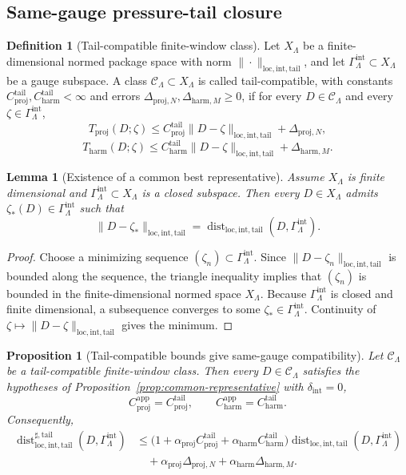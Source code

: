 \documentclass[11pt]{article}
\numberwithin{equation}{section}
\newtheorem{proposition}[proposition]{Proposition}
\newtheorem{lemma}[lemma]{Lemma}
\theoremstyle{definition}
\newtheorem{definition}[definition]{Definition}
\theoremstyle{remark}
\DeclareMathOperator{\dist}{dist}
\newcommand{\loc}{\mathrm{loc}}
\newcommand{\intg}{\mathrm{int}}
\newcommand{\tail}{\mathrm{tail}}
\newcommand{\proj}{\mathrm{proj}}
\newcommand{\app}{\mathrm{app}}
\newcommand{\harm}{\mathrm{harm}}
\newcommand{\calC}{\mathcal C}
\newcommand{\Gammaint}{\Gamma^{\intg}_{\Lambda}}
\begin{document}
\subsection{Same-gauge pressure-tail closure}
\label{sec:same-gauge-closure}

\begin{definition}[Tail-compatible finite-window class]\label{def:tail-compatible-class}
Let $X_\Lambda$ be a finite-dimensional normed package space with norm
$\|\cdot\|_{\loc,\intg,\tail}$, and let $\Gammaint\subset X_\Lambda$ be a gauge subspace.
A class $\calC_\Lambda\subset X_\Lambda$ is called tail-compatible, with constants
$C^{\tail}_{\proj},C^{\tail}_{\harm}<\infty$ and errors
$\Delta_{\proj,N},\Delta_{\harm,M}\ge0$, if for every $D\in\calC_\Lambda$ and every
$\zeta\in\Gammaint$,
\[
T_{\proj}(D;\zeta)
\le
C^{\tail}_{\proj}\|D-\zeta\|_{\loc,\intg,\tail}+\Delta_{\proj,N},
\]
\[
T_{\harm}(D;\zeta)
\le
C^{\tail}_{\harm}\|D-\zeta\|_{\loc,\intg,\tail}+\Delta_{\harm,M}.
\]
\end{definition}

\begin{lemma}[Existence of a common best representative]\label{lem:best-representative}
Assume $X_\Lambda$ is finite dimensional and $\Gammaint\subset X_\Lambda$ is a closed
subspace.  Then every $D\in X_\Lambda$ admits $\zeta_*(D)\in\Gammaint$ such that
\[
        \|D-\zeta_*\|_{\loc,\intg,\tail}
        =
        \dist_{\loc,\intg,\tail}(D,\Gammaint).
\]
\end{lemma}

\begin{proof}
Choose a minimizing sequence $(\zeta_n)\subset\Gammaint$.  Since
$\|D-\zeta_n\|_{\loc,\intg,\tail}$ is bounded along the sequence, the triangle inequality
implies that $(\zeta_n)$ is bounded in the finite-dimensional normed space $X_\Lambda$.
Because $\Gammaint$ is closed and finite dimensional, a subsequence converges to some
$\zeta_*\in\Gammaint$.  Continuity of $\zeta\mapsto\|D-\zeta\|_{\loc,\intg,\tail}$ gives the
minimum.
\end{proof}

\begin{proposition}[Tail-compatible bounds give same-gauge compatibility]
\label{prop:tail-compatible-same-gauge}
Let $\calC_\Lambda$ be a tail-compatible finite-window class.  Then every
$D\in\calC_\Lambda$ satisfies the hypotheses of Proposition~\ref{prop:common-representative} with
$\delta_{\intg}=0$,
\[
        C^{\app}_{\proj}=C^{\tail}_{\proj},
        \qquad
        C^{\app}_{\harm}=C^{\tail}_{\harm}.
\]
Consequently,
\begin{align}\label{eq:tail-compatible-comparison}
\dist^{\sharp,\tail}_{\loc,\intg,\tail}(D,\Gammaint)
&\le
\bigl(1+\alpha_{\proj}C^{\tail}_{\proj}
+\alpha_{\harm}C^{\tail}_{\harm}\bigr)
\dist_{\loc,\intg,\tail}(D,\Gammaint)\nonumber\\
&\quad+
\alpha_{\proj}\Delta_{\proj,N}
+
\alpha_{\harm}\Delta_{\harm,M}.
\end{align}
\end{proposition}
\end{document}
